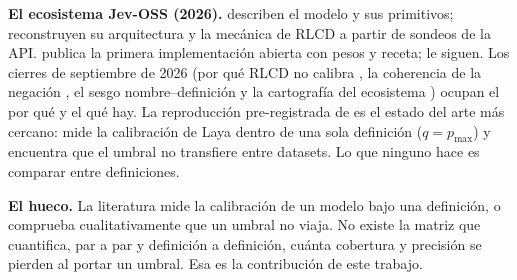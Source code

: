 \textbf{El ecosistema Jev-OSS (2026).} \cite{jev2026blog,jev2026docs} describen el modelo y sus primitivos;
\cite{archerhume,navinpai} reconstruyen su arquitectura y la mecánica de RLCD a partir de sondeos de la API.
\cite{layaRepo} publica la primera implementación abierta con pesos y receta;
\cite{kevRepo,nimble,semif,jeff} le siguen. Los cierres de septiembre de 2026 (por qué RLCD no calibra
\cite{arXiv2609.38850,lakoreai2026}, la coherencia de la negación \cite{arXiv2609.33209}, el sesgo
nombre--definición \cite{arXiv2609.26758} y la cartografía del ecosistema \cite{arXiv2609.30216}) ocupan el
\guillemotleft por qué\guillemotright{} y el \guillemotleft qué hay\guillemotright. La reproducción
pre-registrada de \cite{arXiv2609.33843} es el estado del arte más cercano: mide la calibración de Laya
dentro de una sola definición ($q = p_{\max}$) y encuentra que el umbral no transfiere entre
datasets. Lo que ninguno hace es comparar entre definiciones.

\textbf{El hueco.} La literatura mide la calibración de un modelo bajo una definición, o comprueba
cualitativamente que un umbral no viaja. No existe la matriz que cuantifica, par a par y definición
a definición, cuánta cobertura y precisión se pierden al portar un umbral. Esa es la contribución de este
trabajo.
